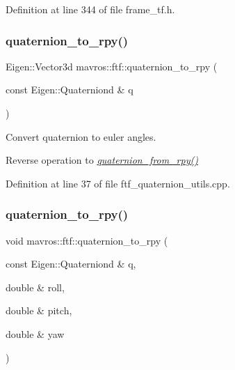 Definition at line 344 of file frame\+\_\+tf.\+h.

\mbox{\label{group__nodelib_ga75c2e15dab0c54198e7f1e620744fb80}} 
\subsubsection{\texorpdfstring{quaternion\_to\_rpy()}{quaternion\_to\_rpy()}\hspace{0.1cm}{\footnotesize\ttfamily [1/2]}}
{\footnotesize\ttfamily Eigen\+::\+Vector3d mavros\+::ftf\+::quaternion\+\_\+to\+\_\+rpy (\begin{DoxyParamCaption}\item[{const Eigen\+::\+Quaterniond \&}]{q }\end{DoxyParamCaption})}



Convert quaternion to euler angles. 

Reverse operation to {\itshape \mbox{\hyperlink{group__nodelib_ga1f1d174745db801a82766fa0839b17e1}{quaternion\+\_\+from\+\_\+rpy()}}} 

Definition at line 37 of file ftf\+\_\+quaternion\+\_\+utils.\+cpp.

\mbox{\label{group__nodelib_gad1544765df8671798047de7800adb1b3}} 
\subsubsection{\texorpdfstring{quaternion\_to\_rpy()}{quaternion\_to\_rpy()}\hspace{0.1cm}{\footnotesize\ttfamily [2/2]}}
{\footnotesize\ttfamily void mavros\+::ftf\+::quaternion\+\_\+to\+\_\+rpy (\begin{DoxyParamCaption}\item[{const Eigen\+::\+Quaterniond \&}]{q,  }\item[{double \&}]{roll,  }\item[{double \&}]{pitch,  }\item[{double \&}]{yaw }\end{DoxyParamCaption})\hspace{0.3cm}{\ttfamily [inline]}}




